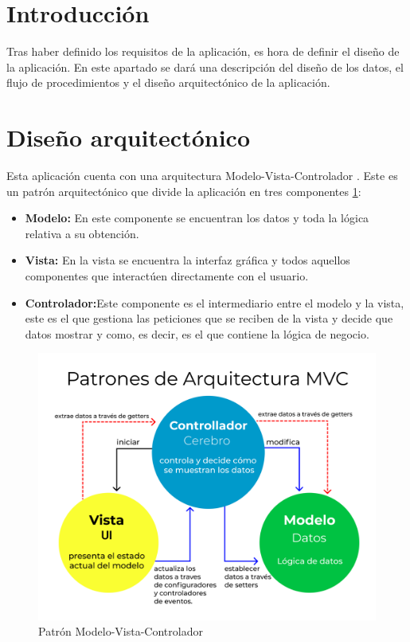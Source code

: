 
\section{Introducción}
Tras haber definido los requisitos de la aplicación, es hora de definir el diseño de la aplicación. En este apartado se dará una descripción del diseño de los datos, el flujo de procedimientos y el diseño arquitectónico de la aplicación.

\section{Diseño arquitectónico}
Esta aplicación cuenta con una arquitectura Modelo-Vista-Controlador \cite{mvc}. Este es un patrón arquitectónico que divide la aplicación en tres componentes \ref{fig:mvc}:
\begin{itemize}
    \item \textbf{Modelo:} En este componente se encuentran los datos y toda la lógica relativa a su obtención.
    \item \textbf{Vista:} En la vista se encuentra la interfaz gráfica y todos aquellos componentes que interactúen directamente con el usuario.
    \item \textbf{Controlador:}Este componente es el intermediario entre el modelo y la vista, este es el que gestiona las peticiones que se reciben de la vista y decide que datos mostrar y como, es decir, es el que contiene la lógica de negocio.
\end{itemize}

\begin{figure}[H]
    \centering
    \includegraphics[width=1\linewidth]{img/MVC.png}
    \caption{Patrón Modelo-Vista-Controlador}
    \label{fig:mvc}
\end{figure}

